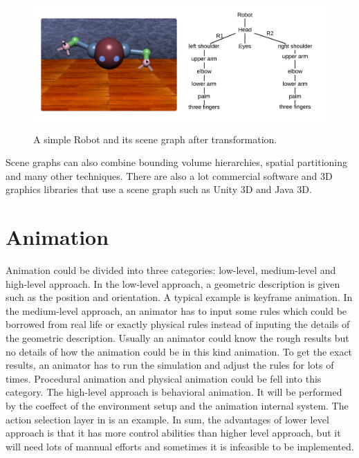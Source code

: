 \begin{figure}[ht!]
\centering
\includegraphics[width=12cm,height=5cm]{figures/scenegraph2.png}
\caption{A simple Robot and its scene graph after transformation.}
\label{fig:scenegraph2}
\end{figure}
Scene graphs can also combine bounding volume hierarchies, spatial
partitioning and many other techniques. There are also a lot commercial
software and 3D graphics libraries that use a scene graph such as Unity 3D and
Java 3D.
\section {Animation}
Animation could be divided into three categories: low-level, medium-level and high-level approach\cite{alan3D}. In the low-level approach, a geometric description is given such as the position and orientation. A typical example is keyframe animation.  In the medium-level approach, an animator has to input some rules which could be borrowed from real life or exactly physical rules instead of inputing the details of the geometric description. Usually an animator could know the rough results but no details of how the animation could be in this kind animation. To get the exact results, an animator has to run the simulation and adjust the rules for lots of times. Procedural animation and physical animation could be fell into this category. The high-level approach is behavioral animation.\cite{animationSlides} It will be performed by the coeffect of the environment setup and the animation internal system. The action selection layer in \cite{steering} is an example. In sum, the advantages of lower level approach is that it has more control abilities than higher level approach, but it will need lots of mannual efforts and sometimes it is infeasible to be implemented.
 
